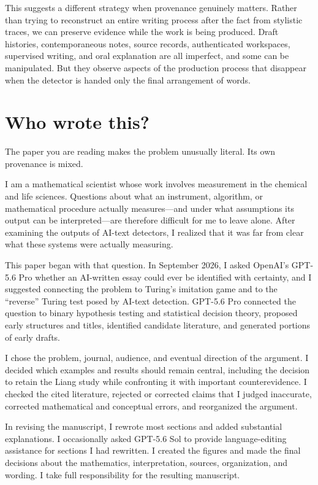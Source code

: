 \documentclass[pdflatex,sn-mathphys-num]{sn-jnl}
\begin{document}
This suggests a different strategy when provenance genuinely matters. Rather than trying to
reconstruct an entire writing process after the fact from stylistic traces, we can preserve evidence
while the work is being produced. Draft histories, contemporaneous notes, source records,
authenticated workspaces, supervised writing, and oral explanation are all imperfect, and some can
be manipulated. But they observe aspects of the production process that disappear when the detector
is handed only the final arrangement of words.

\section*{Who wrote this?}
The paper you are reading makes the problem unusually literal. Its own provenance is mixed.

I am a mathematical scientist whose work involves measurement in the chemical and life sciences. Questions 
about what an instrument, algorithm, or mathematical procedure actually measures—and under what 
assumptions its output can be interpreted—are therefore difficult for me to leave alone. After examining 
the outputs of AI-text detectors, I realized that it was far from clear what these systems were actually 
measuring.

This paper began with that question. In September 2026, I asked OpenAI's GPT-5.6 Pro whether an AI-written 
essay could ever be identified with certainty, and I suggested connecting the problem to Turing's imitation 
game and to the ``reverse'' Turing test posed by AI-text detection. GPT-5.6 Pro connected the question to 
binary hypothesis testing and statistical decision theory, proposed early structures and titles, identified 
candidate literature, and generated portions of early drafts.

I chose the problem, journal, audience, and eventual direction of the argument. I decided which examples 
and results should remain central, including the decision to retain the Liang study while confronting it with 
important counterevidence. I checked the cited literature, rejected or corrected claims that I judged inaccurate, 
corrected mathematical and conceptual errors, and reorganized the argument.

In revising the manuscript, I rewrote most sections and added substantial explanations. I occasionally asked 
GPT-5.6 Sol to provide language-editing assistance for sections I had rewritten. I created the figures and 
made the final decisions about the mathematics, interpretation, sources, organization, and wording. I take 
full responsibility for the resulting manuscript.
\end{document}
